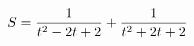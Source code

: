 \documentclass[preview]{standalone}
\begin{document}
\begin{align*}
\special{dvisvgm:raw <g id='unique000'>}S=\frac{1}{t^2-2t+2}+\frac{1}{t^2+2t+2}\special{dvisvgm:raw </g>}
\end{align*}
\end{document}
